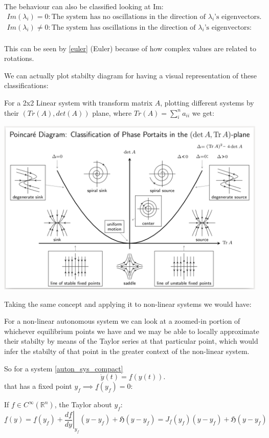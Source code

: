 The behaviour can also be classified looking at Im:
\begin{gather*}
Im(\lambda_i) = 0 : \text{The system has no oscillations in the direction of } \lambda_i \text{'s eigenvectors.} \\
Im(\lambda_i) \neq 0 : \text{The system has oscillations in the direction of } \lambda_i \text{'s eigenvectors:} \\
\end{gather*}

This can be seen by \ref{euler} (Euler) because of how complex values are related to rotations.

We can actually plot stabilty diagram for having a visual representation of these classifications:

For a 2x2 Linear system with transform matrix $A$, plotting different systems by their $(Tr(A), det(A))$ plane, where $Tr(A) = \sum_{i}^{n}a_{ii}$ we get:

\includegraphics[width=13cm]{math_pics/Stability_Diagram.png}

\newpage

Taking the same concept and applying it to non-linear systems we would have:

For a non-linear autonomous system we can look at a zoomed-in portion of whichever equilibrium points we have and we may be able to locally approximate their stabilty by means of the Taylor series at that particular point, which would infer the stabilty of that point in the greater context of the non-linear system.

So for a system \ref{auton_sys_compact}
\[
\dot{y}(t) = \underline{f}(y(t)).
\] that has a fixed point $y_f \implies \underline{f}(y_f) = 0$:

If $f \in C^\infty(\mathbb{R}^n) $, the Taylor about $y_f$:
\begin{equation}\label{eq:t_taylor_expansion}
\underline{f}(y) = \underline{f}(y_f) + \left. \frac{d \underline{f}}{dy} \right|_{y_f}(y - y_f) + \mathfrak{H}(y - y_f) = J_{\underline{f}}(y_f)(y - y_f) + \mathfrak{H}(y - y_f) \tag{Taylor}
\end{equation}

